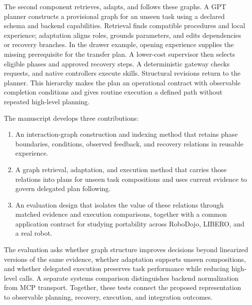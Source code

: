 \documentclass[10pt,twocolumn,letterpaper]{article}
\begin{document}
The second component retrieves, adapts, and follows these graphs. A GPT planner constructs a provisional graph for an unseen task using a declared schema and backend capabilities. Retrieval finds compatible procedures and local experience; adaptation aligns roles, grounds parameters, and edits dependencies or recovery branches. In the drawer example, opening experience supplies the missing prerequisite for the transfer plan. A lower-cost supervisor then selects eligible phases and approved recovery steps. A deterministic gateway checks requests, and native controllers execute skills. Structural revisions return to the planner. This hierarchy makes the plan an operational contract with observable completion conditions and gives routine execution a defined path without repeated high-level planning.

The manuscript develops three contributions:
\begin{enumerate}
\item An interaction-graph construction and indexing method that retains phase boundaries, conditions, observed feedback, and recovery relations in reusable experience.
\item A graph retrieval, adaptation, and execution method that carries those relations into plans for unseen task compositions and uses current evidence to govern delegated plan following.
\item An evaluation design that isolates the value of these relations through matched evidence and execution comparisons, together with a common application contract for studying portability across RoboDojo, LIBERO, and a real robot.
\end{enumerate}

The evaluation asks whether graph structure improves decisions beyond linearized versions of the same evidence, whether adaptation supports unseen compositions, and whether delegated execution preserves task performance while reducing high-level calls. A separate systems comparison distinguishes backend normalization from MCP transport. Together, these tests connect the proposed representation to observable planning, recovery, execution, and integration outcomes.

\end{document}
